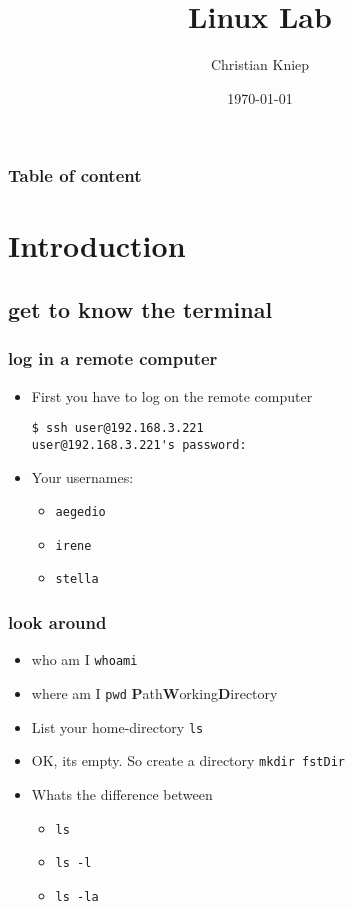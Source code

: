 \documentclass[handout]{beamer}
\author{Christian Kniep}
\newcommand{\code}[1]{\colorbox{lGray}{\texttt{#1}}}
\begin{document}
\title[Linux Lab]{Linux Lab}  
\date[\today]{\today} 

\begin{frame}
	\titlepage
\end{frame} 

\begin{frame}
	\frametitle{Table of content}
	\tableofcontents
\end{frame} 


\section{Introduction} 
	\subsection{get to know the terminal}
		\begin{frame}[fragile]
			\frametitle{log in a remote computer}
			\begin{itemize}
				\item<1-> First you have to log on the remote computer \\
                        \begin{verbatim}
$ ssh user@192.168.3.221
user@192.168.3.221's password: 
\end{verbatim}
                \item<2-> Your usernames:
                \begin{itemize}
                    \item<2-> \code{aegedio}
                    \item<2-> \code{irene}
                    \item<2-> \code{stella}
                \end{itemize}
            \end{itemize}
		\end{frame}
        \begin{frame}
			\frametitle{look around}
			\begin{itemize}
                \item<1-> who am I \code{whoami}
                \item<2-> where am I \code{pwd} \textbf{P}ath\textbf{W}orking\textbf{D}irectory
				\item<3-> List your home-directory \code{ls}
                \item<4-> OK, its empty. So create a directory \code{mkdir fstDir}
                \item<5-> Whats the difference between
                \begin{itemize}
                    \item<5-> \code{ls}
                    \item<5-> \code{ls -l}
                    \item<5-> \code{ls -la}                    
                \end{itemize}
            \end{itemize}
		\end{frame}
\end{document}
